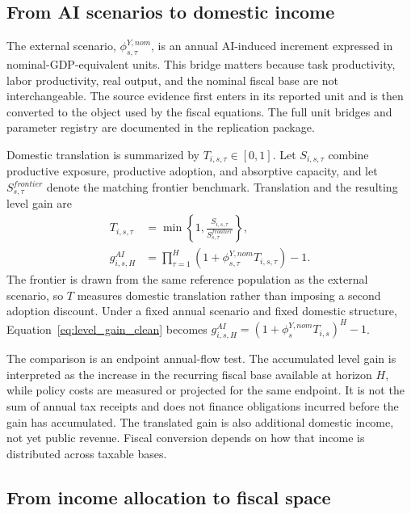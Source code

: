 \subsection{From AI scenarios to domestic income}\label{subsec:scenario_translation}

The external scenario, $\phi^{Y,nom}_{s,\tau}$, is an annual AI-induced increment expressed in nominal-GDP-equivalent units. This bridge matters because task productivity, labor productivity, real output, and the nominal fiscal base are not interchangeable. The source evidence first enters in its reported unit and is then converted to the object used by the fiscal equations. The full unit bridges and parameter registry are documented in the replication package.

Domestic translation is summarized by $T_{i,s,\tau}\in[0,1]$. Let $S_{i,s,\tau}$ combine productive exposure, productive adoption, and absorptive capacity, and let $S^{frontier}_{s,\tau}$ denote the matching frontier benchmark. Translation and the resulting level gain are
\begin{align}
  T_{i,s,\tau}
    &=\min\left\{1,\frac{S_{i,s,\tau}}{S^{frontier}_{s,\tau}}\right\},
    \label{eq:translation_clean}\\
  g^{AI}_{i,s,H}
    &=\prod_{\tau=1}^{H}
      \left(1+\phi^{Y,nom}_{s,\tau}T_{i,s,\tau}\right)-1.
    \label{eq:level_gain_clean}
\end{align}
The frontier is drawn from the same reference population as the external scenario, so $T$ measures domestic translation rather than imposing a second adoption discount. Under a fixed annual scenario and fixed domestic structure, Equation~\eqref{eq:level_gain_clean} becomes $g^{AI}_{i,s,H}=(1+\phi^{Y,nom}_{s}T_{i,s})^H-1$.

The comparison is an endpoint annual-flow test. The accumulated level gain is interpreted as the increase in the recurring fiscal base available at horizon $H$, while policy costs are measured or projected for the same endpoint. It is not the sum of annual tax receipts and does not finance obligations incurred before the gain has accumulated. The translated gain is also additional domestic income, not yet public revenue. Fiscal conversion depends on how that income is distributed across taxable bases.

\subsection{From income allocation to fiscal space}\label{subsec:income_to_fiscal_space}

